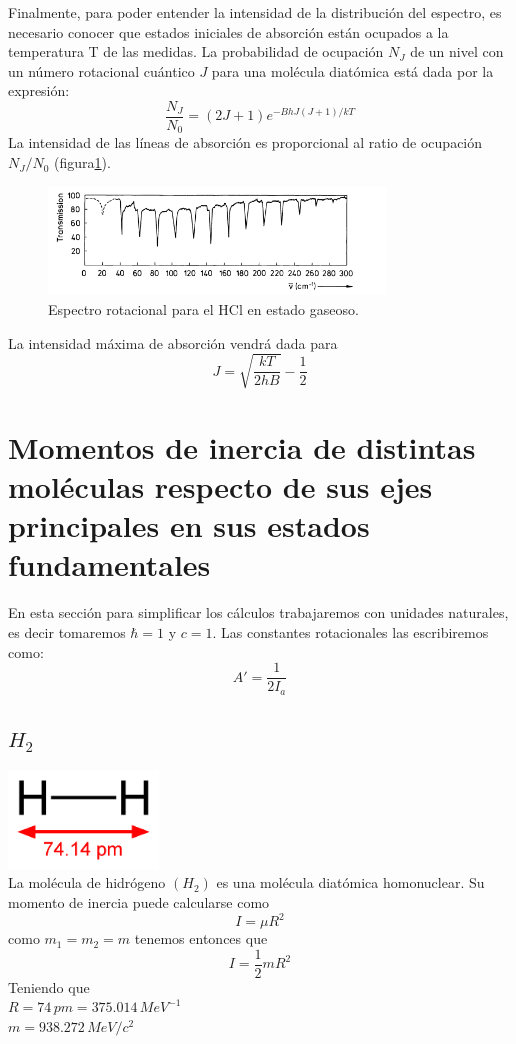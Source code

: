 \documentclass[a4paper]{article}
\begin{document}
Finalmente, para poder entender la intensidad de la distribución del espectro, es necesario conocer que estados iniciales de absorción están ocupados a la temperatura T de las medidas. La probabilidad de ocupación $N_J$ de un nivel con un número rotacional cuántico $J$  para una molécula diatómica está dada por la expresión:
\begin{equation}
\frac{N_J}{N_0}=(2J+1)e^{-BhJ(J+1)/kT}
\end{equation}
La intensidad de las líneas de absorción es proporcional al ratio de ocupación $N_J/N_0$ (figura\ref{intensidad}). 
\begin{figure}
\includegraphics[width=0.8\textwidth]{intensidad.png}
\caption{Espectro rotacional para el HCl en estado gaseoso.}
\label{intensidad}
\end{figure}
La intensidad máxima de absorción vendrá dada para
\begin{equation}
J=\sqrt{\frac{kT}{2hB}}-\frac{1}{2}
\end{equation}

\section{Momentos de inercia de distintas moléculas respecto de sus ejes principales en sus estados fundamentales}
En esta sección  para simplificar los cálculos trabajaremos con unidades naturales, es decir tomaremos $\hbar = 1$ y $c=1$.
Las constantes rotacionales las escribiremos como:
$$A' = \frac{1}{2I_a}$$
\subsection{$H_2$}
\includegraphics[width=0.3\textwidth]{hidrogeno.png}\\
La molécula de hidrógeno $(H_2)$ es una molécula diatómica homonuclear. Su momento de inercia puede calcularse como $$I=\mu R^2$$
como $m_1=m_2=m$ tenemos entonces que $$I=\frac{1}{2}mR^2$$
Teniendo que\\
 $R=74 \, pm=375.014 \, MeV^{-1}$\\
 $m=938.272 \, MeV/c^2$\\
 
\end{document}
